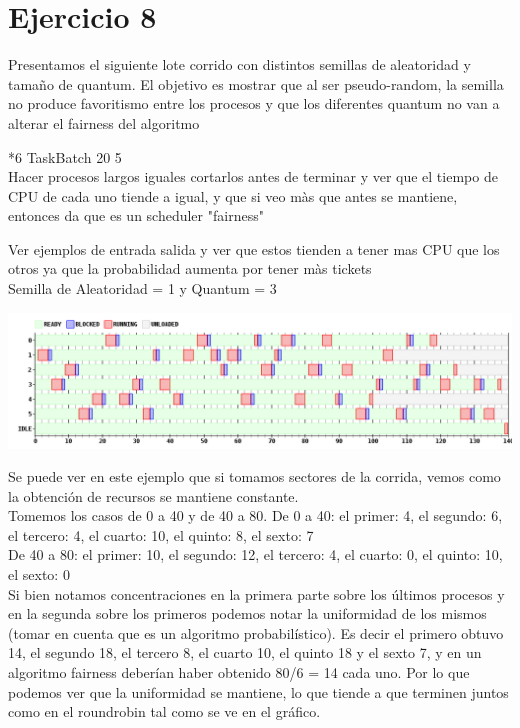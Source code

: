 \section{Ejercicio 8}

Presentamos el siguiente lote corrido con distintos semillas de aleatoridad y tamaño de quantum.
El objetivo es mostrar que al ser pseudo-random, la semilla no produce favoritismo entre los procesos y que los diferentes quantum no van a alterar el fairness del algoritmo

*6 TaskBatch 20 5 \\

Hacer procesos largos iguales cortarlos antes de terminar y ver que el tiempo de CPU de cada uno tiende a igual, y que si veo màs que antes se mantiene, 
entonces da que es un scheduler "fairness"

Ver ejemplos de entrada salida y ver que estos tienden a tener mas CPU que los otros ya que la probabilidad aumenta por tener màs tickets\\

Semilla de Aleatoridad = 1 y Quantum = 3
\begin {center}
\includegraphics[width=16cm]{../simusched/outputs/ej8/sl-ej8-1-3.png}
\end {center}
Se puede ver en este ejemplo que si tomamos sectores de la corrida, vemos como la obtención de recursos se mantiene constante.\\
Tomemos los casos de 0 a 40 y de 40 a 80.
De 0 a 40: el primer: 4, el segundo: 6, el tercero: 4, el cuarto: 10, el quinto: 8, el sexto: 7 \\
De 40 a 80: el primer: 10, el segundo: 12, el tercero: 4, el cuarto: 0, el quinto: 10, el sexto: 0 \\
Si bien notamos concentraciones en la primera parte sobre los últimos procesos y en la segunda sobre los primeros podemos notar la uniformidad de los mismos (tomar en cuenta que es un algoritmo probabilístico).
Es decir el primero obtuvo 14, el segundo 18, el tercero 8, el cuarto 10, el quinto 18 y el sexto 7, y en un algoritmo fairness deberían haber obtenido 80/6 = 14 cada uno.
Por lo que podemos ver que la uniformidad se mantiene, lo que tiende a que terminen juntos como en el roundrobin tal como se ve en el gráfico.\\

